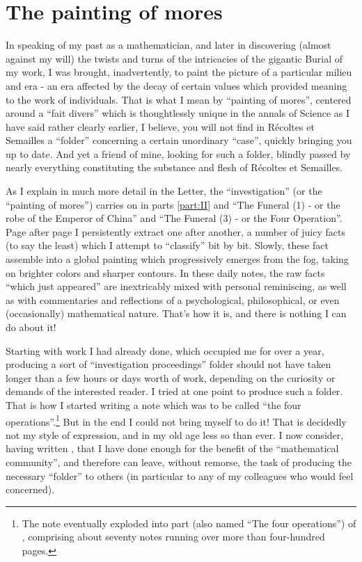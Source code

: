 \section{The painting of mores}

In speaking of my past as a mathematician, and later in discovering (almost against my
will) the twists and turns of the intricacies of the gigantic Burial of my work, I was
brought, inadvertently, 
to paint the picture of a particular milieu and era - an era
affected by the decay of certain values
which provided meaning to the work of individuals.
That is what I mean by
``painting of mores'', centered around a 
``fait divers'' which is thoughtlessly unique in the annals of Science
as I have said rather clearly earlier, I believe, you will not find in 
R\'ecoltes et Semailles
a ``folder'' concerning a certain unordinary ``case'', quickly bringing you up to date.
And yet a friend of mine, looking for such a folder, 
blindly passed by nearly
everything constituting the substance and flesh of 
R\'ecoltes et Semailles.

As I explain in much more detail in the Letter, the ``investigation'' (or the ``painting
of mores'') carries on in 
parts \ref{part:II} and 
``The Funeral (1)
- or the robe of the Emperor of China'' and 
``The Funeral (3) - or the Four Operation''. 
Page after page I persistently extract one after another, 
a number of juicy facts (to say the least) which I attempt to ``classify''
bit by bit. Slowly, these fact
assemble into a global painting which progressively 
emerges from the fog, taking on brighter colors and 
sharper contours.
In these daily notes, the raw facts
``which just appeared''
are inextricably mixed with personal
reminiscing, as well as with commentaries and reflections of a psychological,
philosophical, or even (occasionally) mathematical nature.
That's how it is, and there is nothing I can do about it!

Starting with work I had already done, 
which occupied me for over a year, producing 
a sort of ``investigation proceedings'' folder
should not have taken longer than a few hours 
or days worth of work, depending
on the curiosity or demands of the interested reader.
I tried at one point to produce such a folder. 
That is how I started writing a note which was to be called ``the four
operations''.\footnote{The note eventually exploded into part 
(also named ``The four operations'') of \rec, comprising about seventy notes 
running over more than four-hundred pages.}
But in the end I could not bring myself to do it!
That is decidedly
not my style of expression, and in my old age less so than ever.
I now consider, having written \rec, 
that I have done enough for the benefit of the ``mathematical community'', 
and therefore can leave, without remorse, 
the task of producing 
the necessary ``folder'' to others (in particular to any of my
colleagues who would feel concerned). 

